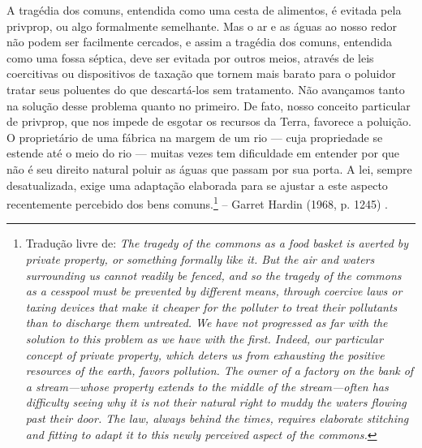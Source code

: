 \documentclass[./main.tex]{subfiles}
\begin{document}
\begin{adjustwidth}{100pt}{0pt}
\medskip
\small A tragédia dos comuns, entendida como uma cesta de alimentos, é evitada pela \gls{privprop}, ou algo formalmente semelhante. Mas o ar e as águas ao nosso redor não podem ser facilmente cercados, e assim a tragédia dos comuns, entendida como uma fossa séptica, deve ser evitada por outros meios, através de leis coercitivas ou dispositivos de taxação que tornem mais barato para o poluidor tratar seus poluentes do que descartá-los sem tratamento. Não avançamos tanto na solução desse problema quanto no primeiro. De fato, nosso conceito particular de \gls{privprop}, que nos impede de esgotar os recursos da Terra, favorece a poluição. O proprietário de uma fábrica na margem de um rio — cuja propriedade se estende até o meio do rio — muitas vezes tem dificuldade em entender por que não é seu direito natural poluir as águas que passam por sua porta. A lei, sempre desatualizada, exige uma adaptação elaborada para se ajustar a este aspecto recentemente percebido dos bens comuns.\footnote{
Tradução livre de: \textit{The tragedy of the commons as a food basket is averted by private property, or something formally like it. But the air and waters surrounding us cannot readily be fenced, and so the tragedy of the commons as a cesspool must be prevented by different means, through coercive laws or taxing devices that make it cheaper for the polluter to treat their pollutants than to discharge them untreated. We have not progressed as far with the solution to this problem as we have with the first. Indeed, our particular concept of private property, which deters us from exhausting the positive resources of the earth, favors pollution. The owner of a factory on the bank of a stream—whose property extends to the middle of the stream—often has difficulty seeing why it is not their natural right to muddy the waters flowing past their door. The law, always behind the times, requires elaborate stitching and fitting to adapt it to this newly perceived aspect of the commons.}
} -- Garret Hardin (1968, p. 1245) \cite{Barnes1939}.
\medskip
\end{adjustwidth}
\end{document}
